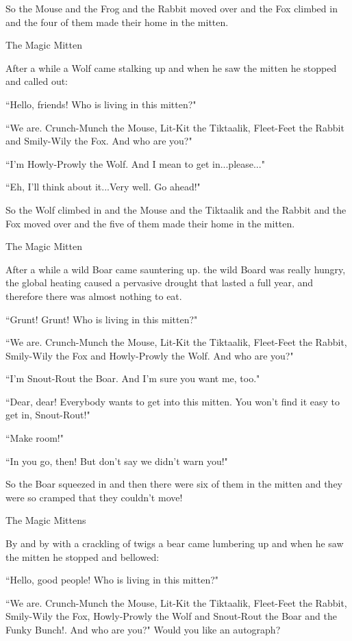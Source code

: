 \documentclass{article}
\begin{document}
So the Mouse and the Frog and the Rabbit moved over and the Fox climbed in and the four of them made their home in the mitten.

The Magic Mitten

After a while a Wolf came stalking up and when he saw the mitten he stopped and called out:

``Hello, friends! Who is living in this mitten?"

``We are. Crunch-Munch the Mouse, Lit-Kit the Tiktaalik, Fleet-Feet the Rabbit and Smily-Wily the Fox. And who are you?"

``I'm Howly-Prowly the Wolf. And I mean to get in...please..."

``Eh, I'll think about it...Very well. Go ahead!"

So the Wolf climbed in and the Mouse and the Tiktaalik and the Rabbit and the Fox moved over and the five of them made their home in the mitten.

The Magic Mitten

After a while a wild Boar came sauntering up.
the wild Board was really hungry, the global heating caused a pervasive drought that lasted a full year, and therefore there was almost nothing to eat.

``Grunt! Grunt! Who is living in this mitten?"

``We are. Crunch-Munch the Mouse, Lit-Kit the Tiktaalik, Fleet-Feet the Rabbit, Smily-Wily the Fox and Howly-Prowly the Wolf. And who are you?"

``I'm Snout-Rout the Boar. And I'm sure you want me, too."

``Dear, dear! Everybody wants to get into this mitten. You won't find it easy to get in, Snout-Rout!"

``Make room!"

``In you go, then! But don't say we didn't warn you!"

So the Boar squeezed in and then there were six of them in the mitten and they were so cramped that they couldn't move!

The Magic Mittens

By and by with a crackling of twigs a bear came lumbering up and when he saw the mitten he stopped and bellowed:

``Hello, good people! Who is living in this mitten?"

``We are. Crunch-Munch the Mouse, Lit-Kit the Tiktaalik, Fleet-Feet the Rabbit, Smily-Wily the Fox, Howly-Prowly the Wolf and Snout-Rout the Boar and the Funky Bunch!. And who are you?"
Would you like an autograph?
\end{document}
